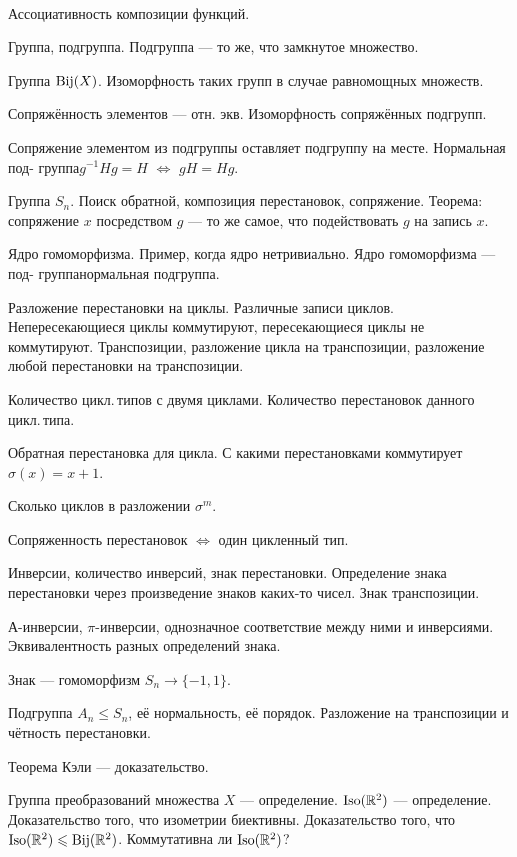 \documentclass[a4paper]{extarticle}
\begin{document}
\ \\ [-0.7cm]

\begin{enumerate}

\itm Ассоциативность композиции функций.

\itm Группа, подгруппа. Подгруппа — то же, что замкнутое множество.

\itm Группа $\operatorname{Bij}(X)$. Изоморфность таких групп в случае равномощных множеств.

\itm Сопряжённость элементов — отн. экв. Изоморфность сопряжённых подгрупп.

\itm Сопряжение элементом из подгруппы оставляет подгруппу на месте. Нормальная под- группа\scolon $g^{-1}Hg = H$ $\Leftrightarrow$ $gH=Hg$.

\itm Группа $S_n$. Поиск обратной, композиция перестановок, сопряжение. Теорема: сопряжение $x$ посредством $g$ — то же самое, что подействовать $g$ на запись $x$.

\itm Ядро гомоморфизма. Пример, когда ядро нетривиально. Ядро гомоморфизма — под- группа\scolon нормальная подгруппа.

\itm Разложение перестановки на циклы. Различные записи циклов. Непересекающиеся циклы коммутируют, пересекающиеся циклы не коммутируют. Транспозиции, разложение цикла на транспозиции, разложение любой перестановки на транспозиции.

\itm Количество цикл.\,типов с двумя циклами. Количество перестановок данного цикл.\,типа.

\itm Обратная перестановка для цикла. С какими перестановками коммутирует $\sigma(x) = x+1$.

\itm Сколько циклов в разложении $\sigma^m$.

\itm Сопряженность перестановок $\Longleftrightarrow$ один цикленный тип.

\itm Инверсии, количество инверсий, знак перестановки. Определение знака перестановки через произведение знаков каких-то чисел. Знак транспозиции.

\itm А-инверсии, $\pi$-инверсии, однозначное соответствие между ними и инверсиями. Эквивалентность разных определений знака. 

\itm Знак — гомоморфизм $S_n \longrightarrow \{ -1, 1\}$.

\itm Подгруппа $A_n \leqslant S_n$, её нормальность, её порядок. Разложение на транспозиции и чётность перестановки.

\itm Теорема Кэли — доказательство.

\itm Группа преобразований множества $X$ — определение. $\operatorname{Iso} (\mathbb R^2)$ — определение. Доказательство того, что изометрии биективны. Доказательство того, что $\operatorname{Iso} (\mathbb R^2) \leqslant \operatorname{Bij} (\mathbb R^2)$. Коммутативна ли $\operatorname{Iso} (\mathbb R^2)$?


\end{enumerate}
\end{document}
